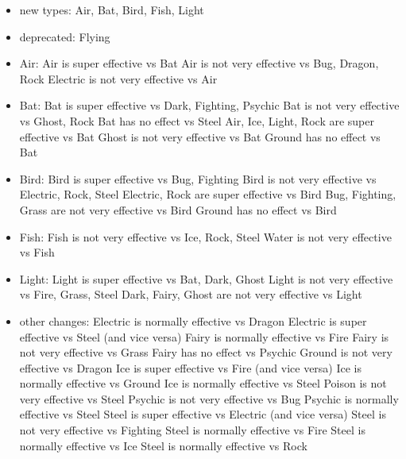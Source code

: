 \documentclass{article}
\begin{document}
\begin{itemize}
\item new types: Air, Bat, Bird, Fish, Light
\item deprecated: Flying
\item Air:
\subitem Air is super effective vs Bat
\subitem Air is not very effective vs Bug, Dragon, Rock
\subitem Electric is not very effective vs Air
\item Bat:
\subitem Bat is super effective vs Dark, Fighting, Psychic
\subitem Bat is not very effective vs Ghost, Rock
\subitem Bat has no effect vs Steel
\subitem Air, Ice, Light, Rock are super effective vs Bat
\subitem Ghost is not very effective vs Bat
\subitem Ground has no effect vs Bat
\item Bird:
\subitem Bird is super effective vs Bug, Fighting
\subitem Bird is not very effective vs Electric, Rock, Steel
\subitem Electric, Rock are super effective vs Bird
\subitem Bug, Fighting, Grass are not very effective vs Bird
\subitem Ground has no effect vs Bird
\item Fish:
\subitem Fish is not very effective vs Ice, Rock, Steel
\subitem Water is not very effective vs Fish
\item Light:
\subitem Light is super effective vs Bat, Dark, Ghost
\subitem Light is not very effective vs Fire, Grass, Steel
\subitem Dark, Fairy, Ghost are not very effective vs Light
\item other changes:
\subitem Electric is normally effective vs Dragon %
\subitem Electric is super effective vs Steel (and vice versa) %
\subitem Fairy is normally effective vs Fire %
\subitem Fairy is not very effective vs Grass %
\subitem Fairy has no effect vs Psychic %
\subitem Ground is not very effective vs Dragon %
\subitem Ice is super effective vs Fire (and vice versa) %
\subitem Ice is normally effective vs Ground %
\subitem Ice is normally effective vs Steel %
\subitem Poison is not very effective vs Steel %
\subitem Psychic is not very effective vs Bug %
\subitem Psychic is normally effective vs Steel %
\subitem Steel is super effective vs Electric (and vice versa) %
\subitem Steel is not very effective vs Fighting %
\subitem Steel is normally effective vs Fire %
\subitem Steel is normally effective vs Ice %
\subitem Steel is normally effective vs Rock %
\end{itemize}
\end{document}

